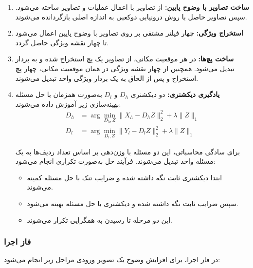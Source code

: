 \begin{enumerate}
\item \textbf{ساخت تصاویر با وضوح پایین:}
از تصاویر  با اعمال عملیات  و  تصاویر  ساخته می‌شود. سپس تصاویر حاصل با روش درونیابی دوکعبی به اندازه اصلی بازگردانده می‌شوند.

\item \textbf{استخراج ویژگی:}
چهار فیلتر مشتقی بر روی تصاویر با وضوح پایین اعمال می‌شود تا چهار نقشه ویژگی حاصل گردد.

\item \textbf{ساخت پچ‌ها:}
در هر موقعیت مکانی، از تصاویر  یک پچ استخراج شده و به بردار تبدیل می‌شود. همچنین از چهار نقشه ویژگی در همان موقعیت مکانی، چهار پچ استخراج و پس از الحاق به یک بردار ویژگی واحد تبدیل می‌شوند.

\item \textbf{یادگیری دیکشنری:}
دو دیکشنری $D_h$ و $D_l$ به‌صورت همزمان با حل مسئله بهینه‌سازی زیر آموزش داده می‌شوند:
\begin{align}
D_h &= \arg\min_{D_h, Z} \|X_h - D_h Z\|_2^2 + \lambda \|Z\|_1 \\
D_l &= \arg\min_{D_l, Z} \|Y_l - D_l Z\|_2^2 + \lambda \|Z\|_1
\end{align}

برای سادگی محاسباتی، این دو مسئله با وزن‌دهی بر اساس تعداد ردیف‌ها به یک مسئله واحد تبدیل می‌شوند. فرآیند حل به‌صورت تکراری انجام می‌شود:
\begin{itemize}
\item ابتدا دیکشنری ثابت نگه داشته شده و ضرایب تنک با حل مسئله  کمینه می‌شوند.
\item سپس ضرایب ثابت نگه داشته شده و دیکشنری با حل مسئله  بهینه می‌شود.
\item این دو مرحله تا رسیدن به همگرایی تکرار می‌شوند.
\end{itemize}
\end{enumerate}

\subsubsection{فاز اجرا}
در فاز اجرا، برای افزایش وضوح یک تصویر ورودی مراحل زیر انجام می‌شود:

